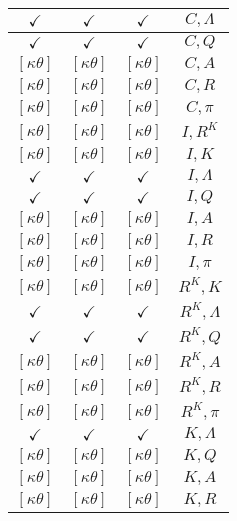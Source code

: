 \documentclass[a4paper,10pt]{article}
\begin{document}
\begin{longtable}{|c|c|c|c|}
\hline
$\checkmark$ & $\checkmark$ & $\checkmark$ & ${C},{\Lambda}$ \\
\hline
$\checkmark$ & $\checkmark$ & $\checkmark$ & ${C},{Q}$ \\
\hline
$[\kappa \theta ]$ & $[\kappa \theta ]$ & $[\kappa \theta ]$ & ${C},{A}$ \\
\hline
$[\kappa \theta ]$ & $[\kappa \theta ]$ & $[\kappa \theta ]$ & ${C},{R}$ \\
\hline
$[\kappa \theta ]$ & $[\kappa \theta ]$ & $[\kappa \theta ]$ & ${C},{\pi}$ \\
\hline
$[\kappa \theta ]$ & $[\kappa \theta ]$ & $[\kappa \theta ]$ & ${I},{R^{K}}$ \\
\hline
$[\kappa \theta ]$ & $[\kappa \theta ]$ & $[\kappa \theta ]$ & ${I},{K}$ \\
\hline
$\checkmark$ & $\checkmark$ & $\checkmark$ & ${I},{\Lambda}$ \\
\hline
$\checkmark$ & $\checkmark$ & $\checkmark$ & ${I},{Q}$ \\
\hline
$[\kappa \theta ]$ & $[\kappa \theta ]$ & $[\kappa \theta ]$ & ${I},{A}$ \\
\hline
$[\kappa \theta ]$ & $[\kappa \theta ]$ & $[\kappa \theta ]$ & ${I},{R}$ \\
\hline
$[\kappa \theta ]$ & $[\kappa \theta ]$ & $[\kappa \theta ]$ & ${I},{\pi}$ \\
\hline
$[\kappa \theta ]$ & $[\kappa \theta ]$ & $[\kappa \theta ]$ & ${R^{K}},{K}$ \\
\hline
$\checkmark$ & $\checkmark$ & $\checkmark$ & ${R^{K}},{\Lambda}$ \\
\hline
$\checkmark$ & $\checkmark$ & $\checkmark$ & ${R^{K}},{Q}$ \\
\hline
$[\kappa \theta ]$ & $[\kappa \theta ]$ & $[\kappa \theta ]$ & ${R^{K}},{A}$ \\
\hline
$[\kappa \theta ]$ & $[\kappa \theta ]$ & $[\kappa \theta ]$ & ${R^{K}},{R}$ \\
\hline
$[\kappa \theta ]$ & $[\kappa \theta ]$ & $[\kappa \theta ]$ & ${R^{K}},{\pi}$ \\
\hline
$\checkmark$ & $\checkmark$ & $\checkmark$ & ${K},{\Lambda}$ \\
\hline
$[\kappa \theta ]$ & $[\kappa \theta ]$ & $[\kappa \theta ]$ & ${K},{Q}$ \\
\hline
$[\kappa \theta ]$ & $[\kappa \theta ]$ & $[\kappa \theta ]$ & ${K},{A}$ \\
\hline
$[\kappa \theta ]$ & $[\kappa \theta ]$ & $[\kappa \theta ]$ & ${K},{R}$ \\

\end{longtable}
\end{document}
